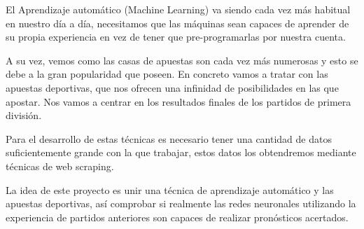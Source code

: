 
El Aprendizaje automático (Machine Learning) va siendo cada vez más habitual en nuestro día a día, necesitamos que las máquinas sean capaces de aprender de su propia experiencia en vez de tener que pre-programarlas por nuestra cuenta.

A su vez, vemos como las casas de apuestas son cada vez más numerosas y esto se debe a la gran popularidad que poseen. En concreto vamos a tratar con las apuestas deportivas, que nos ofrecen una infinidad de posibilidades en las que apostar. Nos vamos a centrar en los resultados finales  de los partidos de primera división.

Para el desarrollo de estas técnicas es necesario tener una cantidad de datos suficientemente grande con la que trabajar, estos datos los obtendremos mediante técnicas de web scraping.

La idea de este proyecto es unir una técnica de aprendizaje automático y las apuestas deportivas, así comprobar si realmente las redes neuronales utilizando la experiencia de partidos anteriores son capaces de realizar pronósticos acertados.




